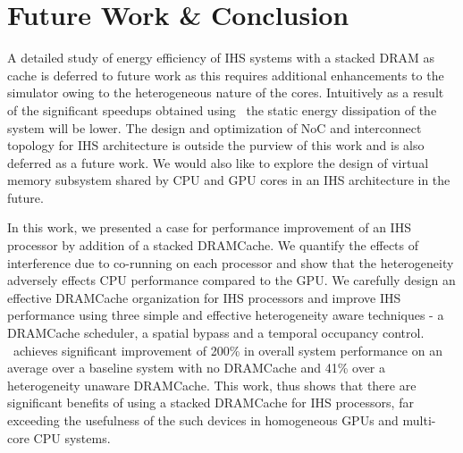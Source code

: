 \section{Future Work \& Conclusion} \label{conclusion}
A detailed study of energy efficiency of IHS systems with a stacked DRAM as cache is deferred to future work as this requires additional enhancements to the simulator owing to the heterogeneous nature of the cores. Intuitively as a result of the significant speedups obtained using \cachename\ the static energy dissipation of the system will be lower. The design and optimization of NoC and interconnect topology for IHS architecture is outside the purview of this work and is also deferred as a future work. We would also like to explore the design of virtual memory subsystem shared by CPU and GPU cores in an IHS architecture in the future.
\par In this work, we presented a case for performance improvement of an IHS processor by addition of a stacked DRAMCache. We quantify the effects of interference due to co-running on each processor and show that the heterogeneity adversely effects CPU performance compared to the GPU. 
We carefully design an effective DRAMCache organization for IHS processors
and improve IHS performance using three simple and effective heterogeneity aware techniques - a DRAMCache scheduler, a spatial bypass and a temporal occupancy control. \cachename\ achieves significant improvement of 200\% in overall system performance on an average over a baseline system with no DRAMCache and 41\% over a heterogeneity unaware DRAMCache. This work, thus shows that there are significant benefits of using a stacked DRAMCache for IHS processors, far exceeding the usefulness of the such devices in homogeneous GPUs and multi-core CPU systems.